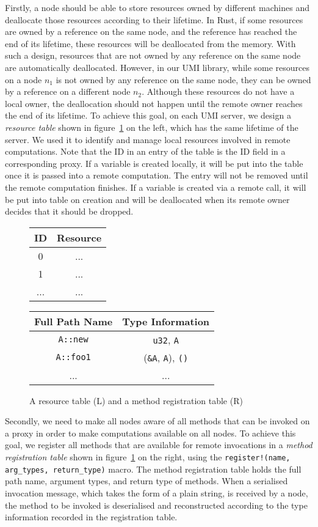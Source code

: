 Firstly, a node should be able to store resources owned by different machines and deallocate those resources according to their lifetime.
In Rust, if some resources are owned by a reference on the same node, and the reference has reached the end of its lifetime, these resources will be deallocated from the memory. With such a design, resources that are not owned by any reference on the same node are automatically deallocated. However, in our UMI library, while some resources on a node $n_1$ is not owned by any reference on the same node, they can be owned by a reference on a different node $n_2$. Although these resources do not have a local owner, the deallocation should not happen until the remote owner reaches the end of its lifetime. 
To achieve this goal, on each UMI server, we design a \emph{resource table} shown in figure~\ref{chap3:impl:tables} on the left, which has the same lifetime of the server. We used it to identify and manage local resources involved in remote computations. Note that the ID in an entry of the table is the ID field in a corresponding proxy.
If a variable is created locally, it will be put into the table once it is passed into a remote computation. The entry will not be removed until the remote computation finishes. If a variable is created via a remote call, it will be put into table on creation and will be deallocated when its remote owner decides that it should be dropped.
\begin{figure}
\centering
\begin{tabular}{ |c|c| } 
\hline
\textbf{ID} & \textbf{Resource} \\\hline
0 & ... \\\hline
1 & ... \\\hline
... & ... \\
\hline
\end{tabular}
\quad
\begin{tabular}{ |c|c| } 
\hline
\textbf{Full Path Name} & \textbf{Type Information} \\\hline
\texttt{A::new} & \texttt{u32}, \texttt{A} \\\hline
\texttt{A::foo1} &  (\texttt{\&A}, \texttt{A}), \texttt{()} \\\hline
... & ... \\
\hline
\end{tabular}
\caption{A resource table (L) and a method registration table (R)}
\label{chap3:impl:tables}
\end{figure}

Secondly, we need to make all nodes aware of all methods that can be invoked on a proxy in order to make computations available on all nodes. To achieve this goal, we register all methods that are available for remote invocations in a \emph{method registration table} shown in figure~\ref{chap3:impl:tables} on the right, using the \texttt{register!(name, arg\_types, return\_type)} macro. The method registration table holds the full path name, argument types, and return type of methods. When a serialised invocation message, which takes the form of a plain string, is received by a node, the method to be invoked is deserialised and reconstructed according to the type information recorded in the registration table.

